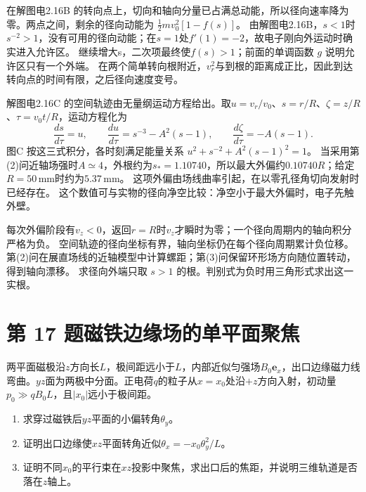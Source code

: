 \documentclass[UTF8,fontset=fandol,a4paper,11pt]{ctexart}
\newcommand{\vect}[1]{\bm{#1}}
\newcommand{\figcaption}[1]{\par\vspace{2pt}{\small\color{muted}#1}\par}
\begin{document}
在解图电2.16B 的转向点上，切向和轴向分量已占满总动能，所以径向速率降为零。两点之间，剩余的径向动能为 $\tfrac12m v_0^2[1-f(s)]$。
由解图电2.16B，$s<1$时$s^{-2}>1$，没有可用的径向动能；在$s=1$处$f'(1)=-2$，故电子刚向外运动时确实进入允许区。
继续增大s，二次项最终使$f(s)>1$；前面的单调函数 $g$ 说明允许区只有一个外端。
在两个简单转向根附近，$v_r^2$与到根的距离成正比，因此到达转向点的时间有限，之后径向速度变号。

解图电2.16C 的空间轨迹由无量纲运动方程给出。取$u=v_r/v_0$、$s=r/R$、$\zeta=z/R$、$\tau=v_0t/R$，运动方程化为
\[
\frac{ds}{d\tau}=u,\qquad
\frac{du}{d\tau}=s^{-3}-A^2(s-1),\qquad
\frac{d\zeta}{d\tau}=-A(s-1).
\]
图C 按这三式积分，各时刻满足能量关系 $u^2+s^{-2}+A^2(s-1)^2=1$。
当采用第(2)问近轴场强时$A\simeq4$，外根约为$s_*=1.10740$，所以最大外偏约$0.10740R$；给定$R=50\,\mathrm{mm}$时约为$5.37\,\mathrm{mm}$。
这项外偏由场线曲率引起，在以零孔径角切向发射时已经存在。
这个数值可与实物的径向净空比较：净空小于最大外偏时，电子先触外壁。

每次外偏阶段有$v_z<0$，返回$r=R$时$v_z$才瞬时为零；一个径向周期内的轴向积分严格为负。
空间轨迹的径向坐标有界，轴向坐标仍在每个径向周期累计负位移。
第(2)问在展直场线的近轴模型中计算螺距；第(3)问保留环形场方向随位置转动，得到轴向漂移。
求径向外端只取 $s>1$ 的根。判别式为负时用三角形式求出这一实根。




\section*{第 17 题\quad 磁铁边缘场的单平面聚焦}\label{q:17}

两平面磁极沿$z$方向长$L$，极间距远小于$L$，内部近似匀强场$B_0\vect e_x$，出口边缘磁力线弯曲。$yz$面为两极中分面。正电荷$q$的粒子从$x=x_0$处沿$+z$方向入射，初动量$p_0\gg qB_0L$，且$|x_0|$远小于极间距。
\begin{enumerate}\item 求穿过磁铁后$yz$平面的小偏转角$\theta_y$。
\item 证明出口边缘使$xz$平面转角近似$\theta_x=-x_0\theta_y^2/L$。
\item 证明不同$x_0$的平行束在$xz$投影中聚焦，求出口后的焦距，并说明三维轨道是否落在$z$轴上。\end{enumerate}

\begin{center}\begin{minipage}{.98\linewidth}\centering
{}\figcaption{图电2.17　示意xz截面内的主磁场和出口边缘场。}\end{minipage}\end{center}
\end{document}
